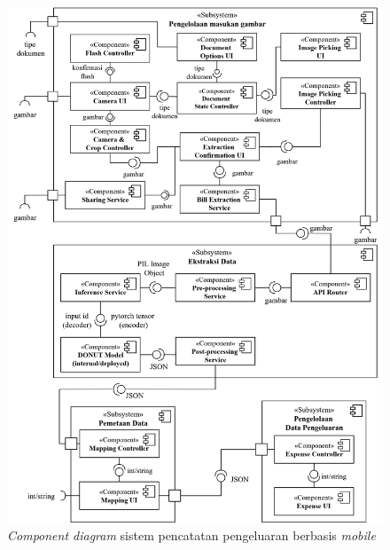 \begin{figure}[htbp]
    \centering
    \includegraphics[width=1\textwidth]{images/component-diagram.png}
    \caption{\emph{Component diagram} sistem pencatatan pengeluaran berbasis \emph{mobile}}
    \label{fig:component-diagram}
\end{figure}